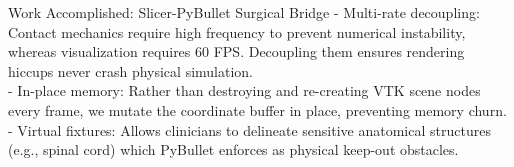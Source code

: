 \documentclass[aspectratio=169, 10pt]{beamer}
\begin{document}
\begin{frame}{Work Accomplished: Slicer-PyBullet Surgical Bridge}
{        - Multi-rate decoupling: Contact mechanics require high frequency to prevent numerical instability, whereas visualization requires 60 FPS. Decoupling them ensures rendering hiccups never crash physical simulation.\\
        - In-place memory: Rather than destroying and re-creating VTK scene nodes every frame, we mutate the coordinate buffer in place, preventing memory churn.\\
        - Virtual fixtures: Allows clinicians to delineate sensitive anatomical structures (e.g., spinal cord) which PyBullet enforces as physical keep-out obstacles.
    }
\end{frame}

\end{document}
